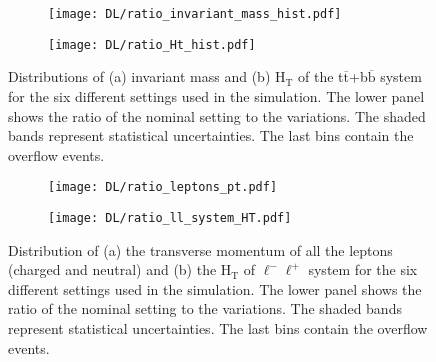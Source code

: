 \begin{figure}[H]
    \centering
    \begin{subfigure}{0.49\textwidth}
        \centering
        \texttt{[image: DL/ratio\_invariant\_mass\_hist.pdf]}
        \caption{}
        \label{subfig:m(ttbb)_DL}        
    \end{subfigure}
    \hfill
    \begin{subfigure}{0.49\linewidth}
        \centering
        \texttt{[image: DL/ratio\_Ht\_hist.pdf]}
        \caption{}
        \label{subfig:HT(ttbb)_DL}
    \end{subfigure}
    \caption{Distributions of (a) invariant mass and (b) H$_{\text{T}}$ of the t$\overline{\text{t}}$+b$\overline{\text{b}}$ system for the six different settings used in the simulation. The lower panel shows the ratio of the nominal setting to the variations. The shaded bands represent statistical uncertainties. The last bins contain the overflow events.}
    \label{fig:ttbb_DL}
\end{figure}
\begin{figure}[H]
    \centering
    \begin{subfigure}{0.49\textwidth}
        \centering
        \texttt{[image: DL/ratio\_leptons\_pt.pdf]}
        \caption{}
        \label{subfig:pt(leptons)_DL}        
    \end{subfigure}
    \hfill
    \begin{subfigure}{0.49\linewidth}
        \centering
        \texttt{[image: DL/ratio\_ll\_system\_HT.pdf]}
        \caption{}
        \label{subfig:HT(ll)_DL}
    \end{subfigure}
    \caption{Distribution of (a) the transverse momentum of all the leptons (charged and neutral) and (b) the H$_{\text{T}}$ of $\ell^-\ell^+$ system for the six different settings used in the simulation. The lower panel shows the ratio of the nominal setting to the variations. The shaded bands represent statistical uncertainties. The last bins contain the overflow events.}
    \label{fig:leptons_DL}
\end{figure}
